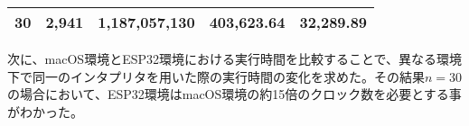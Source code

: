 \begin{table}[htbp]
\begin{center}
\begin{tabular}{rrrrr}
      30 & 2,941 & 1,187,057,130 & 403,623.64 & 32,289.89 \\ \hline
    \end{tabular}
  \end{center}
\end{table}

次に、macOS環境とESP32環境における実行時間を比較することで、異なる環境下で同一のインタプリタを用いた際の実行時間の変化を求めた。その結果$n=30$の場合において、ESP32環境はmacOS環境の約15倍のクロック数を必要とする事がわかった。

